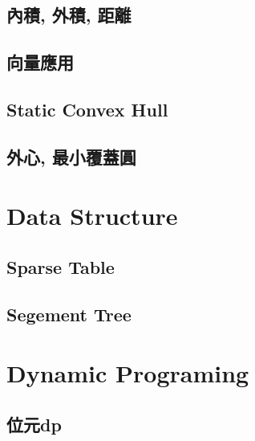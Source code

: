 \subsection{內積, 外積, 距離} 

\subsection{向量應用} 

\subsection{Static Convex Hull} 

\subsection{外心, 最小覆蓋圓} 


\section{Data Structure}
\subsection{Sparse Table}

\subsection{Segement Tree}


\section{Dynamic Programing}
\subsection{位元dp}
